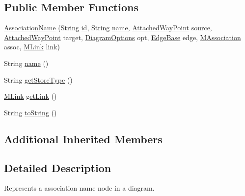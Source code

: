 \subsection*{Public Member Functions}
\begin{DoxyCompactItemize}
\item 
\hyperlink{classorg_1_1tzi_1_1use_1_1gui_1_1views_1_1diagrams_1_1elements_1_1_association_name_aca3d5bb02aece10a9bf4d6b4f2afc1eb}{Association\-Name} (String \hyperlink{classorg_1_1tzi_1_1use_1_1gui_1_1views_1_1diagrams_1_1elements_1_1_edge_property_a628f8eb4c55c3973fb61f0d76787ac0b}{id}, String \hyperlink{classorg_1_1tzi_1_1use_1_1gui_1_1views_1_1diagrams_1_1elements_1_1_association_name_a3172c36e968d7442e3dbce4ebaa281b2}{name}, \hyperlink{classorg_1_1tzi_1_1use_1_1gui_1_1views_1_1diagrams_1_1waypoints_1_1_attached_way_point}{Attached\-Way\-Point} source, \hyperlink{classorg_1_1tzi_1_1use_1_1gui_1_1views_1_1diagrams_1_1waypoints_1_1_attached_way_point}{Attached\-Way\-Point} target, \hyperlink{classorg_1_1tzi_1_1use_1_1gui_1_1views_1_1diagrams_1_1_diagram_options}{Diagram\-Options} opt, \hyperlink{classorg_1_1tzi_1_1use_1_1gui_1_1views_1_1diagrams_1_1elements_1_1edges_1_1_edge_base}{Edge\-Base} edge, \hyperlink{interfaceorg_1_1tzi_1_1use_1_1uml_1_1mm_1_1_m_association}{M\-Association} assoc, \hyperlink{interfaceorg_1_1tzi_1_1use_1_1uml_1_1sys_1_1_m_link}{M\-Link} link)
\item 
String \hyperlink{classorg_1_1tzi_1_1use_1_1gui_1_1views_1_1diagrams_1_1elements_1_1_association_name_a3172c36e968d7442e3dbce4ebaa281b2}{name} ()
\item 
String \hyperlink{classorg_1_1tzi_1_1use_1_1gui_1_1views_1_1diagrams_1_1elements_1_1_association_name_a41b2e487bf148fad1ecfc600b66b20e5}{get\-Store\-Type} ()
\item 
\hyperlink{interfaceorg_1_1tzi_1_1use_1_1uml_1_1sys_1_1_m_link}{M\-Link} \hyperlink{classorg_1_1tzi_1_1use_1_1gui_1_1views_1_1diagrams_1_1elements_1_1_association_name_a5c3bf70cdf5d992b6ea0840675fd22ec}{get\-Link} ()
\item 
String \hyperlink{classorg_1_1tzi_1_1use_1_1gui_1_1views_1_1diagrams_1_1elements_1_1_association_name_ab06bf2a484137570241a256bbd8a7fe2}{to\-String} ()
\end{DoxyCompactItemize}
\subsection*{Additional Inherited Members}


\subsection{Detailed Description}
Represents a association name node in a diagram.

